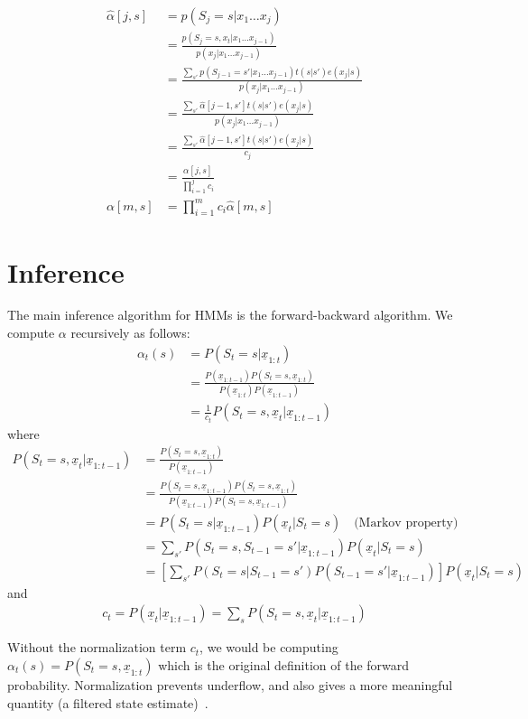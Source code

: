 \begin{align}
\hat{\alpha}[j, s] &= p(S_j = s | x_1\ldots x_j) \\
    &= \frac{p(S_j = s, x_t | x_1\ldots x_{j-1})}{p(x_j|x_1\ldots x_{j - 1})} \\
    &= \frac{\sum_{s'} p(S_{j-1} = s'| x_1\ldots x_{j-1})t(s|s')e(x_j|s)}{p(x_j|x_1\ldots x_{j - 1})} \\
    &= \frac{\sum_{s'} \hat{\alpha}[j-1, s']t(s|s')e(x_j|s)}{p(x_j|x_1\ldots x_{j - 1})} \\
    &= \frac{\sum_{s'} \hat{\alpha}[j-1, s']t(s|s')e(x_j|s)}{c_j} \\
    & = \frac{\alpha[j, s]}{\prod_{i = 1}^j c_i} \\
\alpha[m, s] &= \prod_{i = 1}^m c_i \hat{\alpha}[m, s]
\end{align}

\section{Inference}\label{sec:hmm-infernece}
The main inference algorithm for HMMs is the forward-backward algorithm. We
compute $\alpha$ recursively as follows:
\begin{align}
\alpha_t(s) &= P(S_t=s|\underline{x}_{1:t}) \\
            &= \frac{P(\underline{x}_{1:t-1})P(S_t=s,
            \underline{x}_{1:t})}{P(\underline{x}_{1:t})P(\underline{x}_{1:t-1})}\\
            &= \frac{1}{c_t}P(S_t=s,
\underline{x}_t|\underline{x}_{1:t-1})
\end{align}
where
\begin{align*}
P(S_t=s,\underline{x}_t|\underline{x}_{1:t-1}) &=
\frac{P(S_t=s,\underline{x}_{1:t})}{P(\underline{x}_{1:t-1})} \\
&=
\frac{P(S_t=s,\underline{x}_{1:t-1})P(S_t=s,\underline{x}_{1:t})}{P(\underline{x}_{1:t-1})P(S_t=s,\underline{x}_{1:t-1})}\\
&= P(S_t=s|\underline{x}_{1:t-1})P(\underline{x}_t|S_t=s) \quad \text{(Markov
property)}\\
&= \sum_{s'}P(S_t=s, S_{t-1}=s'|\underline{x}_{1:t-1})P(\underline{x}_t|S_t=s)
\\
&= \left[\sum_{s'}P(S_t=s |
S_{t-1}=s')P(S_{t-1}=s'|\underline{x}_{1:t-1})\right] P(\underline{x}_t|S_t=s)
\end{align*}
and
\begin{align*}
c_t=P(\underline{x}_t|\underline{x}_{1:t-1})=\sum_s P(S_t=s,
\underline{x}_t|\underline{x}_{1:t-1})
\end{align*}

Without the normalization term $c_t$, we would be computing
$\alpha_t(s)=P(S_t=s, \underline{x}_{1:t})$ which is the original definition of
the forward probability. Normalization prevents underflow, and also gives a more
meaningful quantity (a filtered state estimate)~\cite{murphy02}.
